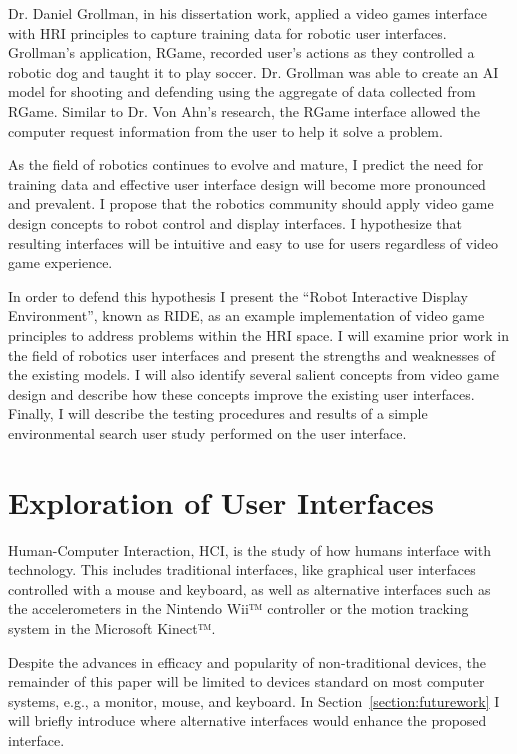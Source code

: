 Dr. Daniel Grollman, in his dissertation work, applied a video games interface with HRI principles to capture training data for robotic user interfaces. \cite{Grollman} Grollman's application, RGame, recorded user’s actions as they controlled a robotic dog and taught it to play soccer. Dr. Grollman was able to create an AI model for shooting and defending using the aggregate of data collected from RGame. Similar to Dr. Von Ahn's research, the RGame interface allowed the computer request information from the user to help it solve a problem.

As the field of robotics continues to evolve and mature, I predict the need for training data and effective user interface design will become more pronounced and prevalent. I propose that the robotics community should apply video game design concepts to robot control and display interfaces. I hypothesize that resulting interfaces will be intuitive and easy to use for users regardless of video game experience.

In order to defend this hypothesis I present the ``Robot Interactive Display Environment'', known as RIDE, as an example implementation of video game principles to address problems within the HRI space. I will examine prior work in the field of robotics user interfaces and present the strengths and weaknesses of the existing models. I will also identify several salient concepts from video game design and describe how these concepts improve the existing user interfaces. Finally, I will describe the testing procedures and results of a simple environmental search user study performed on the user interface.

\chapter{Exploration of User Interfaces}
\label{chapter:ui}

Human-Computer Interaction, HCI, is the study of how humans interface with technology. This includes traditional interfaces, like graphical user interfaces controlled with a mouse and keyboard, as well as alternative interfaces such as the accelerometers in the Nintendo Wii™ controller or the motion tracking system in the Microsoft Kinect™.

Despite the advances in efficacy and popularity of non-traditional devices, the remainder of this paper will be limited to devices standard on most computer systems, e.g., a monitor, mouse, and keyboard. In Section~\ref{section:futurework} I will briefly introduce where alternative interfaces would enhance the proposed interface.

